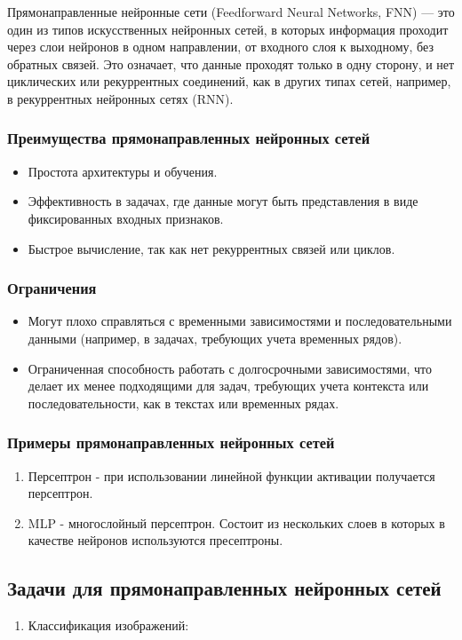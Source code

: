 {Прямонаправленные нейронные сети (Feedforward Neural Networks, FNN) — это один из типов
искусственных нейронных сетей, в которых информация проходит через слои нейронов в одном
направлении, от входного слоя к выходному, без обратных связей. Это означает, что данные проходят
только в одну сторону, и нет циклических или рекуррентных соединений, как в других типах сетей,
например, в рекуррентных нейронных сетях (RNN).
\subsubsection{Преимущества прямонаправленных нейронных сетей}
\begin{itemize}
\item Простота архитектуры и обучения.
\item Эффективность в задачах, где данные могут быть представления в виде фиксированных входных признаков.
\item Быстрое вычисление, так как нет рекуррентных связей или циклов.
\end{itemize}
\subsubsection{Ограничения}
\begin{itemize}
\item Могут плохо справляться с временными зависимостями и последовательными данными (например, в задачах, требующих учета временных рядов).
\item Ограниченная способность работать с долгосрочными зависимостями, что делает их менее подходящими для задач, требующих учета контекста или последовательности, как в текстах или временных рядах.
\end{itemize}
\subsubsection{Примеры прямонаправленных нейронных сетей}
\begin{enumerate}
\item Персептрон - при использовании линейной функции активации получается персептрон.
\item MLP - многослойный персептрон. Состоит из нескольких слоев в которых в качестве нейронов
используются пресептроны.
\end{enumerate}
\subsection{Задачи для прямонаправленных нейронных сетей}
\begin{enumerate}
\item Классификация изображений:


\end{enumerate}}

